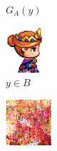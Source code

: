 \documentclass{beamer}
\begin{document}
\begin{frame}
\begin{figure}[htb]
\begin{subfigure}[b]{0.23\linewidth}
        \caption{$G_A(y)$}
      \end{subfigure}
      \begin{subfigure}[b]{0.23\linewidth}
        \includegraphics[width=\linewidth]{exp3_epoch194_real_B.png}
        \caption{$y \in B$}
      \end{subfigure}
      \begin{subfigure}[b]{0.23\linewidth}
        \includegraphics[width=\linewidth]{exp3_epoch194_fake_A.png}

\end{subfigure}
\end{figure}
\end{frame}
\end{document}
